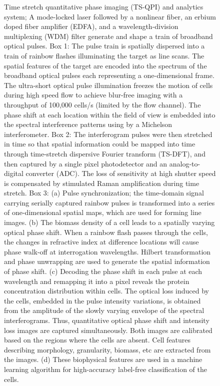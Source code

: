 \documentclass[aps,pra,reprint,superscriptaddress]{revtex4-1}
\begin{document}
\begin{figure}
\caption{\label{fig:Setup} Time stretch quantitative phase imaging (TS-QPI) and analytics system; A mode-locked laser followed by a nonlinear fiber, an erbium doped fiber amplifier (EDFA), and a wavelength-division multiplexing (WDM) filter generate and shape a train of broadband optical pulses. Box 1: The pulse train is spatially dispersed into a train of rainbow flashes illuminating the target as line scans. The spatial features of the target are encoded into the spectrum of the broadband optical pulses each representing a one-dimensional frame. The ultra-short optical pulse illumination freezes the motion of cells during high speed flow to achieve blur-free imaging with a throughput of 100,000 cells/s (limited by the flow channel). The phase shift at each location within the field of view is embedded into the spectral interference patterns using by a Michelson interferometer. Box 2: The interferogram pulses were then stretched in time so that spatial information could be mapped into time through time-stretch dispersive Fourier transform (TS-DFT), and then captured by a single pixel photodetector and an analog-to-digital converter (ADC). The loss of sensitivity at high shutter speed is compensated by stimulated Raman amplification during time stretch. Box 3: (a) Pulse synchronization; the time-domain signal carrying serially captured rainbow pulses is transformed into a series of one-dimensional spatial maps, which are used for forming line images. (b) The biomass density of a cell leads to a spatially varying optical phase shift. When a rainbow flash passes through the cells, the changes in refractive index at difference locations will cause phase walk-off at interrogation wavelengths. Hilbert transformation and phase unwrapping are used to generate the spatial information of phase shift. (c) Decoding the phase shift in each pulse at each wavelength and remapping it into a pixel reveals the protein concentration distribution within cells. The optical loss induced by the cells, embedded in the pulse intensity variations, is obtained from the amplitude of the slowly varying envelope of the spectral interferograms. Thus, quantitative optical phase shift and intensity loss images are captured simultaneously. Both images are calibrated based on the regions where the cells are absent. Cell features describing morphology, granularity, biomass, etc are extracted from the images. (d) These biophysical features are used in a machine learning algorithm for high-accuracy label-free classification of the cells.}
\end{figure}
\end{document}
